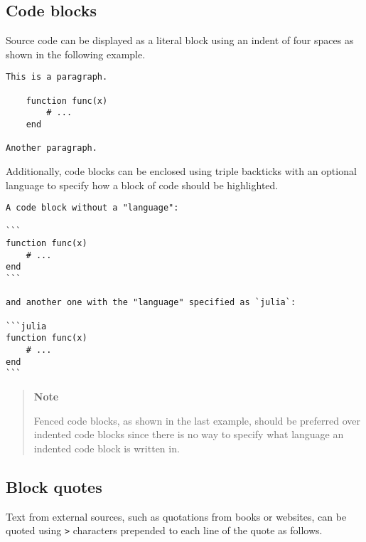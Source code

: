 \hypertarget{9246544299434150790}{}


\subsection{Code blocks}



Source code can be displayed as a literal block using an indent of four spaces as shown in the following example.




\begin{lstlisting}
This is a paragraph.

    function func(x)
        # ...
    end

Another paragraph.
\end{lstlisting}



Additionally, code blocks can be enclosed using triple backticks with an optional {\textquotedbl}language{\textquotedbl} to specify how a block of code should be highlighted.




\begin{lstlisting}
A code block without a "language":

```
function func(x)
    # ...
end
```

and another one with the "language" specified as `julia`:

```julia
function func(x)
    # ...
end
```
\end{lstlisting}



\begin{quote}
\textbf{Note}

{\textquotedbl}Fenced{\textquotedbl} code blocks, as shown in the last example, should be preferred over indented code blocks since there is no way to specify what language an indented code block is written in.

\end{quote}


\hypertarget{12305052721486916392}{}


\subsection{Block quotes}



Text from external sources, such as quotations from books or websites, can be quoted using \texttt{>} characters prepended to each line of the quote as follows.




